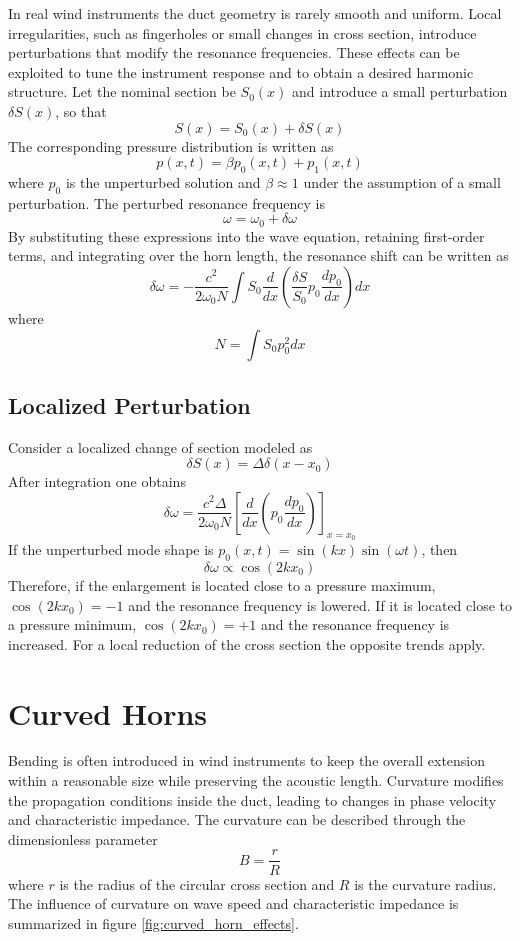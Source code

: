 In real wind instruments the duct geometry is rarely smooth and uniform. Local irregularities, such as fingerholes or small changes in cross section, introduce perturbations that modify the resonance frequencies. These effects can be exploited to tune the instrument response and to obtain a desired harmonic structure. Let the nominal section be \( S_{0}(x) \) and introduce a small perturbation \( \delta S(x) \), so that
\[
S(x) = S_{0}(x) + \delta S(x)
\]
The corresponding pressure distribution is written as
\[
p(x,t) = \beta p_{0}(x,t) + p_{1}(x,t)
\]
where \( p_{0} \) is the unperturbed solution and \( \beta \approx 1 \) under the assumption of a small perturbation. The perturbed resonance frequency is
\[
\omega = \omega_{0} + \delta\omega
\]
By substituting these expressions into the wave equation, retaining first-order terms, and integrating over the horn length, the resonance shift can be written as
\[
\delta\omega
=
-\frac{c^{2}}{2\omega_{0}N}
\int S_{0}\frac{d}{dx}\left(\frac{\delta S}{S_{0}}p_{0}\frac{dp_{0}}{dx}\right)dx
\]
where
\[
N = \int S_{0}p_{0}^{2}dx
\]

\subsection{Localized Perturbation}

Consider a localized change of section modeled as
\[
\delta S(x) = \Delta\delta(x-x_{0})
\]
After integration one obtains 
\[
\delta\omega
=
\frac{c^{2}\Delta}{2\omega_{0}N}
\left[
\frac{d}{dx}\left(p_{0}\frac{dp_{0}}{dx}\right)
\right]_{x=x_{0}}
\]
If the unperturbed mode shape is \( p_{0}(x,t) = \sin(kx)\sin(\omega t) \), then
\[
\delta\omega \propto \cos(2kx_{0})
\]
Therefore, if the enlargement is located close to a pressure maximum, \( \cos(2kx_{0})=-1 \) and the resonance frequency is lowered. If it is located close to a pressure minimum, \( \cos(2kx_{0})=+1 \) and the resonance frequency is increased. For a local reduction of the cross section the opposite trends apply. 

\section{Curved Horns}

Bending is often introduced in wind instruments to keep the overall extension within a reasonable size while preserving the acoustic length. Curvature modifies the propagation conditions inside the duct, leading to changes in phase velocity and characteristic impedance. The curvature can be described through the dimensionless parameter
\[
B = \frac{r}{R}
\]
where \( r \) is the radius of the circular cross section and \( R \) is the curvature radius. The influence of curvature on wave speed and characteristic impedance is summarized in figure \ref{fig:curved_horn_effects}.

